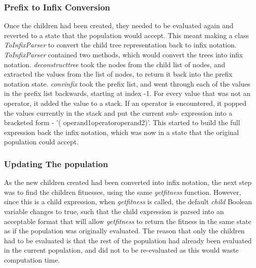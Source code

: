\documentclass[11pt]{article}
\begin{document}
\subsubsection{Prefix to Infix Conversion}
Once the children had been created, they needed to be evaluated again and reverted to a state that the population would accept. This meant making a class \textit{ToInfixParser} to convert the child tree representation back to infix notation. 
\textit{ToInfixParser} contained two methods, which would convert the trees into infix notation. \textit{deconstruct\textunderscore tree} took the nodes from the child list of nodes, and extracted the values from the list of nodes, to return it back into the prefix notation state. 
\textit{conv\textunderscore infix} took the prefix list, and went through each of the values in the prefix list backwards, starting at index -1. For every value that was not an operator, it added the value to a stack. If an operator is encountered, it popped the values currently in the stack and put the current sub- expression into a bracketed form - '( \textlangle{}operand1\textrangle{}\textlangle{}operator\textrangle{}\textlangle{}operand2\textrangle{})'. This started to build the full expression back the infix notation, which was now in a state that the original population could accept.
\subsubsection{Updating The population}
As the new children created had been converted into infix notation, the next step was to find the children fitnesses, using the same \textit{get\textunderscore fitness} function. However,  since this is a child expression, when \textit{get\textunderscore fitness} is called, the default \textit{child} Boolean variable changes to true, such that the child expression is parsed into an acceptable format that will allow \textit{get\textunderscore fitness} to return the fitness in the same state as if the population was originally evaluated. The reason that only the children had to be evaluated is that the rest of the population had already been evaluated in the current population, and did not to be re-evaluated as this would waste computation time.  \\
\end{document}
